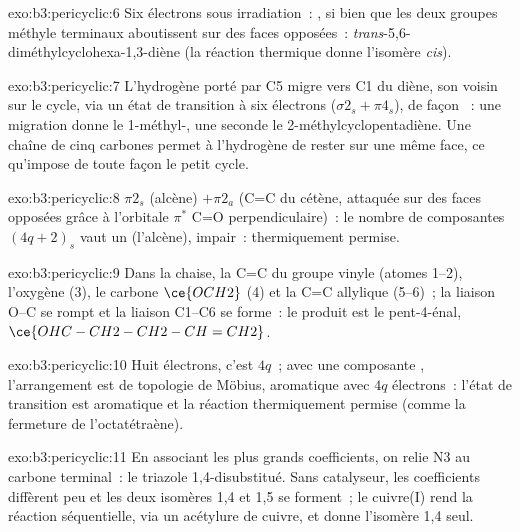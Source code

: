 \begin{solution}{exo:b3:pericyclic:6}
Six électrons sous irradiation~: , si bien que les deux groupes
méthyle terminaux aboutissent sur des faces opposées~: \textit{trans}-5,6-diméthylcyclohexa-1,3-diène (la réaction thermique donne
l'isomère \textit{cis}).
\end{solution}

\begin{solution}{exo:b3:pericyclic:7}
L'hydrogène porté par C5 migre vers C1 du diène, son voisin sur le cycle,
via un état de transition à six électrons ($\sigma2_s + \pi4_s$), de façon ~: une migration
donne le 1-méthyl-, une seconde le 2-méthylcyclopentadiène. Une chaîne de
cinq carbones permet à l'hydrogène de rester sur une même face, ce
qu'impose de toute façon le petit cycle.
\end{solution}

\begin{solution}{exo:b3:pericyclic:8}
$\pi2_s$ (alcène) $+ \pi2_a$ (C=C du cétène, attaquée sur des faces opposées grâce à
l'orbitale $\pi^*$ C=O perpendiculaire)~: le nombre de composantes $(4q + 2)_s$ vaut un (l'alcène), impair~:
thermiquement permise.
\end{solution}

\begin{solution}{exo:b3:pericyclic:9}
Dans la chaise, la C=C du groupe vinyle (atomes 1--2), l'oxygène (3), le carbone $\ce{OCH2}$
(4) et la C=C allylique (5--6)~; la liaison O--C se rompt et la liaison C1--C6
se forme~: le produit est le pent-4-énal,
$\ce{OHC-CH2-CH2-CH=CH2}$.
\end{solution}

\begin{solution}{exo:b3:pericyclic:10}
Huit électrons, c'est $4q$~; avec une composante ,
l'arrangement est de topologie de Möbius, aromatique avec $4q$ électrons~: l'état de transition est aromatique et la
réaction thermiquement permise (comme la fermeture  de
l'octatétraène).
\end{solution}

\begin{solution}{exo:b3:pericyclic:11}
En associant les plus grands coefficients, on relie N3 au carbone
terminal~: le triazole 1,4-disubstitué. Sans catalyseur, les coefficients
diffèrent peu et les deux isomères 1,4 et 1,5 se forment~; le cuivre(I)
rend la réaction séquentielle, via un acétylure de cuivre, et donne
l'isomère 1,4 seul.
\end{solution}

